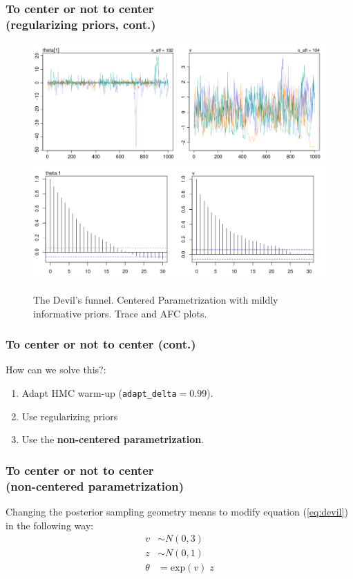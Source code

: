 \documentclass[arial,12pt,xcolor=dvipsnames]{beamer}
\begin{document}
\begin{frame}
	\frametitle{To center or not to center \\
		(regularizing priors, cont.)}
	\begin{figure}[h] 
		\centering
			\includegraphics[width=.70\linewidth]{2_trace_CE_priors}
			\includegraphics[width=.73\linewidth]{2_acf_CE_priors}
		\caption{The Devil's funnel. Centered Parametrization with mildly informative priors. Trace and AFC plots.}
		\label{fig:devil_prior}
	\end{figure}
\end{frame}
%
\begin{frame}
	\frametitle{To center or not to center (cont.)}
	How can we solve this?:
	\begin{enumerate}
		\item Adapt HMC warm-up (\texttt{adapt\_delta}$=0.99$).
		\item Use regularizing priors
		\item Use the \textbf{non-centered parametrization}.
	\end{enumerate}
\end{frame}
%
\begin{frame}
	\frametitle{To center or not to center \\
		(non-centered parametrization)}
	Changing the posterior sampling geometry means to modify equation (\ref{eq:devil}) in the following way:
	\begin{equation} \label{eq:devil_NC}
		\begin{split}	
			v &\sim N(0, 3) \\
			z &\sim N(0, 1) \\
			\theta &= \text{exp}(v) \; z
		\end{split}
	\end{equation}
\end{frame}
\end{document}
